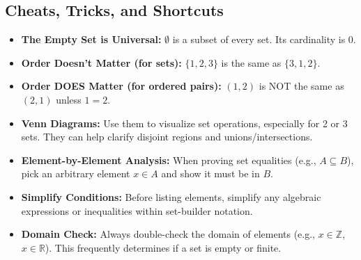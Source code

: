 \documentclass{article}
\begin{document}
\begin{itemize}
\begin{itemize}
\begin{itemize}
\begin{enumerate}
\subsection{Cheats, Tricks, and Shortcuts}
\begin{itemize}
    \item \textbf{The Empty Set is Universal:} $\emptyset$ is a subset of every set. Its cardinality is 0.
    \item \textbf{Order Doesn't Matter (for sets):} $\{1, 2, 3\}$ is the same as $\{3, 1, 2\}$.
    \item \textbf{Order DOES Matter (for ordered pairs):} $(1, 2)$ is NOT the same as $(2, 1)$ unless $1=2$.
    \item \textbf{Venn Diagrams:} Use them to visualize set operations, especially for 2 or 3 sets. They can help clarify disjoint regions and unions/intersections.
    \item \textbf{Element-by-Element Analysis:} When proving set equalities (e.g., $A \subseteq B$), pick an arbitrary element $x \in A$ and show it must be in $B$.
    \item \textbf{Simplify Conditions:} Before listing elements, simplify any algebraic expressions or inequalities within set-builder notation.
    \item \textbf{Domain Check:} Always double-check the domain of elements (e.g., $x \in \mathbb{Z}$, $x \in \mathbb{R}$). This frequently determines if a set is empty or finite.
\end{itemize}


\end{enumerate}
\end{itemize}
\end{itemize}
\end{itemize}
\end{document}
